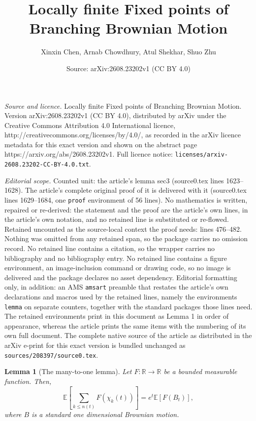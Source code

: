 \documentclass[10pt,a4paper]{amsart}
\title{Locally finite Fixed points of Branching Brownian Motion}
\author{Xinxin Chen, Arnab Chowdhury, Atul Shekhar, Shuo Zhu}
\date{Source: arXiv:2608.23202v1 (CC BY 4.0)}
\newtheorem{lemma}{Lemma}
\begin{document}
\maketitle

\noindent\emph{Source and licence.} Locally finite Fixed points of Branching Brownian Motion. Version arXiv:2608.23202v1 (CC BY 4.0), distributed by arXiv under the Creative Commons Attribution 4.0 International licence, http://creativecommons.org/licenses/by/4.0/, as recorded in the arXiv licence metadata for this exact version and shown on the abstract page https://arxiv.org/abs/2608.23202v1. Full licence notice: \texttt{licenses/arxiv-2608.23202-CC-BY-4.0.txt}.\par\smallskip

\noindent\textit{Editorial scope.} Counted unit: the article's lemma sec3 (source0.tex lines 1623--1628). The article's complete original proof of it is delivered with it (source0.tex lines 1629--1684, one \texttt{proof} environment of 56 lines). No mathematics is written, repaired or re-derived: the statement and the proof are the article's own lines, in the article's own notation, and no retained line is substituted or re-flowed.  Retained uncounted as the source-local context the proof needs: lines 476--482.  Nothing was omitted from any retained span, so the package carries no omission record.  No retained line contains a citation, so the wrapper carries no bibliography and no bibliography entry.  No retained line contains a figure environment, an image-inclusion command or drawing code, so no image is delivered and the package declares no asset dependency.  Editorial formatting only, in addition: an AMS \texttt{amsart} preamble that restates the article's own declarations and macros used by the retained lines, namely the environments \texttt{lemma} on separate counters, together with the standard packages those lines need.  The retained environments print in this document as Lemma 1 in order of appearance, whereas the article prints the same items with the numbering of its own full document.  The complete native source of the article as distributed in the arXiv e-print for this exact version is bundled unchanged as \texttt{sources/208397/source0.tex}.
\begin{lemma}[The many-to-one lemma]\label{Lemma many to one}
Let $F: \mathbb R \to \mathbb R$ be a bounded measurable function. Then, 
    \begin{equation}
        \mathbb E[\sum_{k \le n(t)} F(\chi_k(t))]=e^t \mathbb E[F(B_t)],
    \end{equation}
    where $B$ is a standard one dimensional Brownian motion.
\end{lemma}
\end{document}
